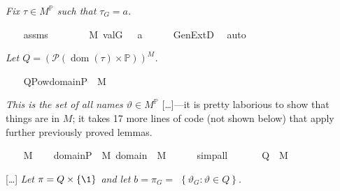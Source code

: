 \textit{Fix $\tau \in  M^{\mathbb{P}}$ such that $\tau_{G}=a$.}
\begin{isabelle}
\ \ \isamarkupfalse%
\ assms\isanewline
\ \ \isamarkupfalse%
\ {\isasymtau}\ \ {\isachardoublequoteopen}{\isasymtau}\ {\isasymin}\ M{\isachardoublequoteclose}\ {\isachardoublequoteopen}val{\isacharparenleft}{\kern0pt}G{\isacharcomma}{\kern0pt}\ {\isasymtau}{\isacharparenright}{\kern0pt}\ {\isacharequal}{\kern0pt}\ a{\isachardoublequoteclose}\isanewline
\ \ \ \ \isamarkupfalse%
\ GenExtD\ \isamarkupfalse%
\ auto
\end{isabelle}
\textit{Let
  $Q=(\mathcal{P}(\operatorname{dom}(\tau) \times
  \mathbb{P}))^{M}$.}
\begin{isabelle}
\ \ \isamarkupfalse%
\ {\isacharquery}{\kern0pt}Q{\isacharequal}{\kern0pt}{\isachardoublequoteopen}Pow{\isacharparenleft}{\kern0pt}domain{\isacharparenleft}{\kern0pt}{\isasymtau}{\isacharparenright}{\kern0pt}{\isasymtimes}P{\isacharparenright}{\kern0pt}\ {\isasyminter}\ M{\isachardoublequoteclose}
\end{isabelle}
\textit{This is the set of all names $\vartheta \in
  M^{\mathbb{P}}$} [\dots]---it is pretty laborious to show that things
are in $M$; it takes 17 more lines of code (not shown below) that
apply further previously proved lemmas.
\begin{isabelle}
\ \ \isamarkupfalse%
\ {\isacartoucheopen}{\isasymtau}{\isasymin}M{\isacartoucheclose}\isanewline
\ \ \isamarkupfalse%
\ {\isachardoublequoteopen}domain{\isacharparenleft}{\kern0pt}{\isasymtau}{\isacharparenright}{\kern0pt}{\isasymtimes}P\ {\isasymin}\ M{\isachardoublequoteclose}\ {\isachardoublequoteopen}domain{\isacharparenleft}{\kern0pt}{\isasymtau}{\isacharparenright}{\kern0pt}\ {\isasymin}\ M{\isachardoublequoteclose}\isanewline
\ \ \ \ \isamarkupfalse%
\ simp{\isacharunderscore}{\kern0pt}all\isanewline
\ \ \isamarkupfalse%
\isanewline
\ \ \isamarkupfalse%
\ {\isachardoublequoteopen}{\isacharquery}{\kern0pt}Q\ {\isasymin}\ M{\isachardoublequoteclose}
\end{isabelle}
[\dots]\textit{ Let $\pi=Q \times\{\1\}$ and let
  $b=\pi_{G}=$ $\left\{\vartheta_{G}: \vartheta \in Q\right\}$.}
